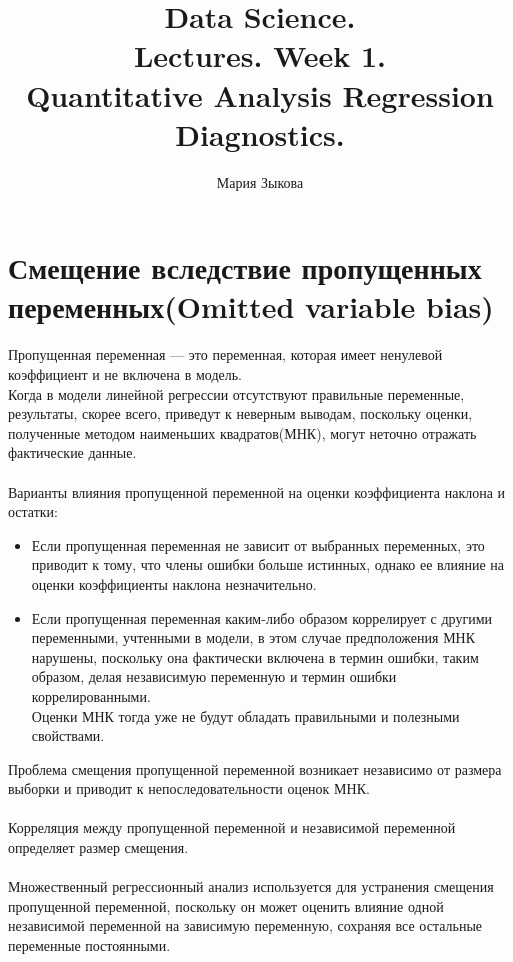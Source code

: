 \documentclass{article}
\title{Data Science.\\
	Lectures. Week 1. \\
	\vspace{0.5cm}
	\huge{Quantitative Analysis Regression Diagnostics.}\vspace{0.5cm}}
\author{Мария Зыкова}
\begin{document}
	\maketitle
	\setcounter{tocdepth}{1} %
	\renewcommand\contentsname{Contents}
	\tableofcontents
	\newpage
	
	\section{Смещение вследствие пропущенных переменных(Omitted variable bias)}
	Пропущенная переменная — это переменная, которая имеет ненулевой коэффициент и не включена в модель.
	\\ 
	Когда в модели линейной регрессии отсутствуют правильные переменные, результаты, скорее всего, приведут к неверным выводам, поскольку оценки, полученные методом наименьших квадратов(МНК), могут неточно отражать фактические данные.
	\\
	\\
	Варианты влияния пропущенной переменной на оценки коэффициента наклона и остатки:
	
	\begin{itemize}
		\item Если пропущенная переменная не зависит от выбранных переменных, это приводит к тому, что члены ошибки больше истинных, однако ее влияние на оценки коэффициенты наклона незначительно. 
		\item Если пропущенная переменная каким-либо образом коррелирует с другими переменными, учтенными в модели, в этом случае предположения МНК нарушены, поскольку она фактически включена в термин ошибки, таким образом, делая независимую переменную и термин ошибки коррелированными.
		\\
		Оценки МНК тогда уже не будут обладать правильными и полезными свойствами.
	\end{itemize}
	Проблема смещения пропущенной переменной возникает независимо от размера выборки и приводит к непоследовательности оценок МНК. 
	\\
	\\
	Корреляция между пропущенной переменной и независимой переменной определяет размер смещения.
	\\
	\\
	Множественный регрессионный анализ используется для устранения смещения пропущенной переменной, поскольку он может оценить влияние одной независимой переменной на зависимую переменную, сохраняя все остальные переменные постоянными.
	
\end{document}
